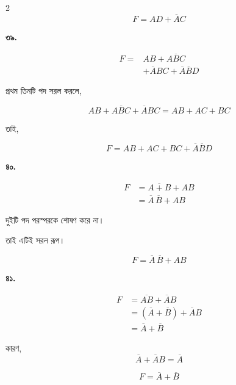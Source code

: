 \begin{multicols}{2}
\[
\boxed{F=AD+\overline AC}
\]

\medskip


\textbf{৩৯.}

\[
\begin{aligned}
F
={}&AB+A\overline BC\\
&+\overline ABC+\overline A\overline BD
\end{aligned}
\]

প্রথম তিনটি পদ সরল করলে,

\[
AB+A\overline BC+\overline ABC
=
AB+AC+BC
\]

তাই,

\[
\boxed{F=AB+AC+BC+\overline A\overline BD}
\]

\medskip


\textbf{৪০.}

\[
\begin{aligned}
F
&=\overline{A+B}+AB\\
&=\overline A\,\overline B+AB
\end{aligned}
\]

দুইটি পদ পরস্পরকে শোষণ করে না।

তাই এটিই সরল রূপ।

\[
\boxed{F=\overline A\,\overline B+AB}
\]

\medskip


\textbf{৪১.}

\[
\begin{aligned}
F
&=\overline{AB}+\overline AB\\
&=(\overline A+\overline B)+\overline AB\\
&=\overline A+\overline B
\end{aligned}
\]

{\footnotesize
কারণ,
\[
\overline A+\overline AB=\overline A
\]
}

\[
\boxed{F=\overline A+\overline B}
\]

\medskip



\end{multicols}
